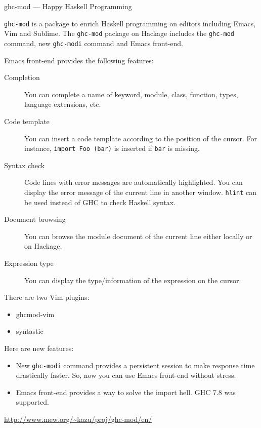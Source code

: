 \begin{hcarentry}[updated]{ghc-mod --- Happy Haskell Programming}
\makeheader

{\tt ghc-mod} is a package to enrich Haskell programming on editors including Emacs, Vim and Sublime. The {\tt ghc-mod} package on Hackage includes the {\tt ghc-mod} command, new {\tt ghc-modi} command and Emacs front-end. 

Emacs front-end provides the following features:

\begin{description}
\item[Completion] You can complete a name of keyword, module, class, function, types, language extensions, etc.

\item[Code template] You can insert a code template according to the position of the cursor. For instance, {\tt import Foo (bar)} is inserted if {\tt bar} is missing.

\item[Syntax check] Code lines with error messages are automatically highlighted. You can display the error message of the current line in another window. {\tt hlint} %
can be used instead of GHC to check Haskell syntax. 

\item[Document browsing] You can browse the module document of the current line either locally or on Hackage.

\item[Expression type] You can display the type/information of the expression on the cursor. 
\end{description}

\noindent
There are two Vim plugins:
\begin{itemize}
\item ghcmod-vim
\item syntastic
\end{itemize}

\noindent
Here are new features:
\begin{itemize}
\item New {\tt ghc-modi} command provides a persistent session to make response time drastically faster. So, now you can use Emacs front-end without stress.
\item Emacs front-end provides a way to solve the import hell.
\itme GHC 7.8 was supported.
\end{itemize}

\FurtherReading
  \url{http://www.mew.org/~kazu/proj/ghc-mod/en/}
\end{hcarentry}
